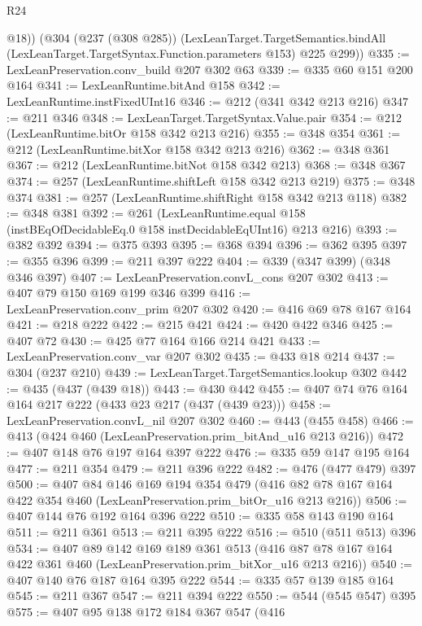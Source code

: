 \begin{lexlean}{R24}
\begin{coremodule}
        @18))
    (@304
      (@237 (@308 @285))
      (LexLeanTarget.TargetSemantics.bindAll
        (LexLeanTarget.TargetSyntax.Function.parameters @153)
        @225
        @299))
@335 := LexLeanPreservation.conv_build @207 @302 @63
@339 := @335 @60 @151 @200 @164
@341 := LexLeanRuntime.bitAnd @158
@342 := LexLeanRuntime.instFixedUInt16
@346 := @212 (@341 @342 @213 @216)
@347 := @211 @346
@348 := LexLeanTarget.TargetSyntax.Value.pair
@354 := @212 (LexLeanRuntime.bitOr @158 @342 @213 @216)
@355 := @348 @354
@361 := @212 (LexLeanRuntime.bitXor @158 @342 @213 @216)
@362 := @348 @361
@367 := @212 (LexLeanRuntime.bitNot @158 @342 @213)
@368 := @348 @367
@374 := @257 (LexLeanRuntime.shiftLeft @158 @342 @213 @219)
@375 := @348 @374
@381 := @257 (LexLeanRuntime.shiftRight @158 @342 @213 @118)
@382 := @348 @381
@392 := @261
    (LexLeanRuntime.equal @158 (instBEqOfDecidableEq.{0} @158 instDecidableEqUInt16) @213 @216)
@393 := @382 @392
@394 := @375 @393
@395 := @368 @394
@396 := @362 @395
@397 := @355 @396
@399 := @211 @397 @222
@404 := @339 (@347 @399) (@348 @346 @397)
@407 := LexLeanPreservation.convL_cons @207 @302
@413 := @407 @79 @150 @169 @199 @346 @399
@416 := LexLeanPreservation.conv_prim @207 @302
@420 := @416 @69 @78 @167 @164
@421 := @218 @222
@422 := @215 @421
@424 := @420 @422 @346
@425 := @407 @72
@430 := @425 @77 @164 @166 @214 @421
@433 := LexLeanPreservation.conv_var @207 @302
@435 := @433 @18 @214
@437 := @304 (@237 @210)
@439 := LexLeanTarget.TargetSemantics.lookup @302
@442 := @435 (@437 (@439 @18))
@443 := @430 @442
@455 := @407 @74 @76 @164 @164 @217 @222 (@433 @23 @217 (@437 (@439 @23)))
@458 := LexLeanPreservation.convL_nil @207 @302
@460 := @443 (@455 @458)
@466 := @413 (@424 @460 (LexLeanPreservation.prim_bitAnd_u16 @213 @216))
@472 := @407 @148 @76 @197 @164 @397 @222
@476 := @335 @59 @147 @195 @164
@477 := @211 @354
@479 := @211 @396 @222
@482 := @476 (@477 @479) @397
@500 := @407
    @84
    @146
    @169
    @194
    @354
    @479
    (@416 @82 @78 @167 @164 @422 @354 @460 (LexLeanPreservation.prim_bitOr_u16 @213 @216))
@506 := @407 @144 @76 @192 @164 @396 @222
@510 := @335 @58 @143 @190 @164
@511 := @211 @361
@513 := @211 @395 @222
@516 := @510 (@511 @513) @396
@534 := @407
    @89
    @142
    @169
    @189
    @361
    @513
    (@416 @87 @78 @167 @164 @422 @361 @460 (LexLeanPreservation.prim_bitXor_u16 @213 @216))
@540 := @407 @140 @76 @187 @164 @395 @222
@544 := @335 @57 @139 @185 @164
@545 := @211 @367
@547 := @211 @394 @222
@550 := @544 (@545 @547) @395
@575 := @407
    @95
    @138
    @172
    @184
    @367
    @547
    (@416

\end{coremodule}
\end{lexlean}

